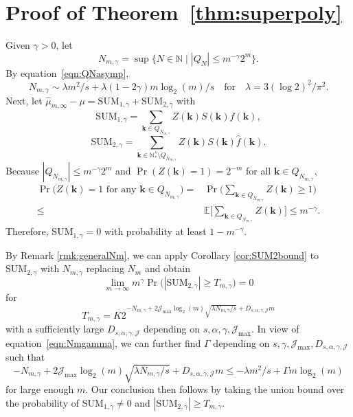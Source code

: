 \documentclass{article}
\theoremstyle{definition}
\renewcommand{\le}{\leqslant}
\renewcommand{\leq}{\leqslant}
\renewcommand{\geq}{\geqslant}
\newcommand{\cj}{\mathcal{J}}
\newcommand{\natu}{\mathbb{N}}
\newcommand{\bsk}{\boldsymbol{k}}
\newcommand{\e}{\mathbb{E}}
\begin{document}
\section{Proof of Theorem~\ref{thm:superpoly}}
Given $\gamma>0$, let
        $$N_{m,\gamma}=\sup \{N\in \natu\mid |Q_N|\le m^{-\gamma} 2^m \}.$$
        By equation~\eqref{eqn:QNasymp}, 
        \begin{equation}\label{eqn:Nmgamma}
    N_{m,\gamma}\sim \lambda m^2/s +\lambda(1-2\gamma) m\log_2(m)/s \quad\text{for} \quad\lambda=3(\log 2)^2/\pi^2. 
\end{equation}
Next, let $\hat{\mu}_{m,\infty}-\mu=\mathrm{SUM}_{1,\gamma}+\mathrm{SUM}_{2,\gamma}$ with
\begin{equation*}
    \mathrm{SUM}_{1,\gamma}=\sum_{\bsk\in Q_{N_{m,\gamma}} }Z(\bsk)S(\bsk)\hat{f}(\bsk),
\end{equation*}
\begin{equation*}
    \mathrm{SUM}_{2,\gamma}=\sum_{\bsk\in  \natu_*^s\setminus  Q_{N_{m,\gamma}}}Z(\bsk)S(\bsk)\hat{f}(\bsk).
\end{equation*}
Because $|Q_{N_{m,\gamma}}|\leq m^{-\gamma}2^m$ and $\Pr(Z(\bsk)=1)=2^{-m}$ for all $\bsk\in Q_{N_{m,\gamma}}$,
\begin{align*}
    \Pr\Big(Z(\bsk)=1 \text{ for any } \bsk\in Q_{N_{m,\gamma}}\Big)=&\Pr\Big(\sum_{\bsk\in Q_{N_{m,\gamma}} }Z(\bsk)\geq 1\Big)\\
    \leq & \e \Big[\sum_{\bsk\in Q_{N_{m,\gamma}} }Z(\bsk)\Big]
    \leq  m^{-\gamma}.
\end{align*}
Therefore, $\mathrm{SUM}_{1,\gamma}=0$ with probability at least $1-m^{-\gamma}$. 

By Remark \ref{rmk:generalNm}, we can apply Corollary \ref{cor:SUM2bound} to $\mathrm{SUM}_{2,\gamma}$ with $N_{m,\gamma}$ replacing $N_m$ and obtain
$$\lim_{m\to\infty} m^{\gamma} \Pr\Big(|\mathrm{SUM}_{2,\gamma}|\geq T_{m,\gamma}\Big)=0$$
for 
$$T_{m,\gamma}=K 2^{-N_{m,\gamma}+2 \cj_{\max}\log_2(m)\sqrt{\lambda N_{m,\gamma}/s}+D_{s,\alpha,\gamma,\cj}m}$$
with a sufficiently large $D_{s,\alpha,\gamma,\cj}$ depending on $s,\alpha,\gamma,\cj_{\max}$. In view of equation~\eqref{eqn:Nmgamma}, we can further find $\Gamma$ depending on $s,\gamma,\cj_{\max},D_{s,\alpha,\gamma,\cj}$ such that 
$${-N_{m,\gamma}+2 \cj_{\max}\log_2(m)\sqrt{\lambda N_{m,\gamma}/s}+D_{s,\alpha,\gamma,\cj}m} \leq -\lambda m^2/s +\Gamma m\log_2(m) $$
for large enough $m$. Our conclusion then follows by taking the union bound over the probability of $\mathrm{SUM}_{1,\gamma}\neq 0$ and $|\mathrm{SUM}_{2,\gamma}|\geq T_{m,\gamma}$.
\end{document}
